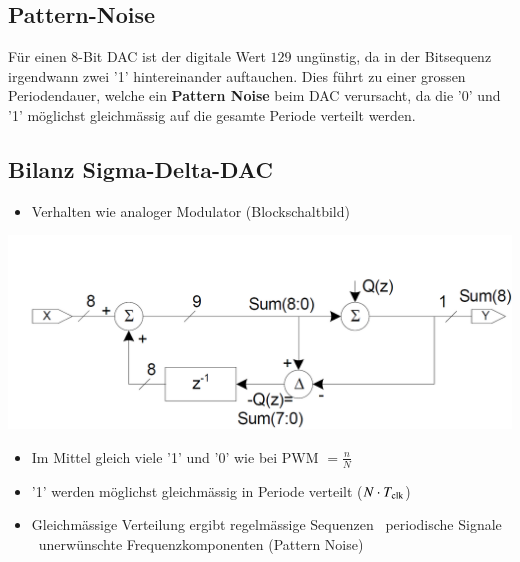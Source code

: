 \subsection{Pattern-Noise}

Für einen 8-Bit DAC ist der digitale Wert $129$ ungünstig, da in der Bitsequenz irgendwann zwei '1' hintereinander auftauchen.
Dies führt zu einer grossen Periodendauer, welche ein \textbf{Pattern Noise} beim DAC verursacht, da die '0' und '1' möglichst
gleichmässig auf die gesamte Periode verteilt werden.




\subsection{Bilanz Sigma-Delta-DAC}

\begin{minipage}[c]{0.48\columnwidth}
    \begin{itemize}
        \item Verhalten wie analoger Modulator (Blockschaltbild)
    \end{itemize}

    \includegraphics[width=\columnwidth]{images/sigma-delta-DAC_blockschaltbild.png}
\end{minipage}
\hfill
\begin{minipage}[c]{0.48\columnwidth}
    \begin{itemize}
        \item Im Mittel gleich viele '1' und '0' wie bei PWM $= \frac{n}{N}$
        \item '1' werden möglichst gleichmässig in Periode verteilt ($N \cdot T_{\rm clk}$)
        \item Gleichmässige Verteilung ergibt regelmässige Sequenzen \textrightarrow\ periodische Signale \textrightarrow\ unerwünschte
            Frequenzkomponenten (Pattern Noise)
    \end{itemize}
\end{minipage}



